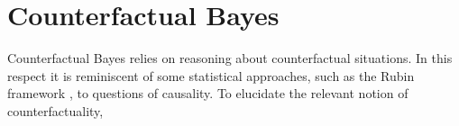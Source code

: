 \documentclass[12pt]{article}
\begin{document}
%
\section{Counterfactual Bayes}\label{counterfactual_bayes}
%
Counterfactual Bayes relies on reasoning about counterfactual situations.
%
In this respect it is reminiscent of some statistical approaches, such as the Rubin framework \citep{Rubin1974}, to questions of causality.
%
To elucidate the relevant notion of counterfactuality, 
%
\end{document}

